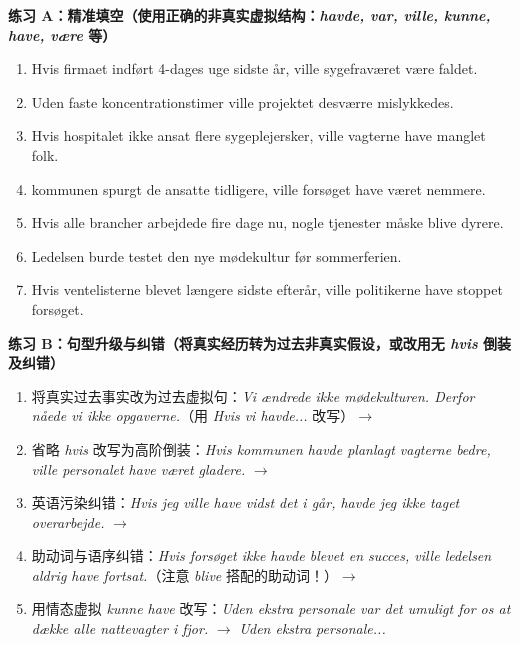 \textbf{练习 A：精准填空（使用正确的非真实虚拟结构：\textit{havde, var, ville, kunne, have, være} 等）}
\begin{enumerate}
  \item Hvis firmaet \underline{\hspace{2.2cm}} indført 4-dages uge sidste år, ville sygefraværet være faldet.
  \item Uden faste koncentrationstimer ville projektet desværre \underline{\hspace{2.2cm}} mislykkedes.
  \item Hvis hospitalet ikke \underline{\hspace{2.2cm}} ansat flere sygeplejersker, ville vagterne have manglet folk.
  \item \underline{\hspace{2.2cm}} kommunen spurgt de ansatte tidligere, ville forsøget have været nemmere.
  \item Hvis alle brancher arbejdede fire dage nu, \underline{\hspace{2.2cm}} nogle tjenester måske blive dyrere.
  \item Ledelsen burde \underline{\hspace{2.2cm}} testet den nye mødekultur før sommerferien.
  \item Hvis ventelisterne \underline{\hspace{1.8cm}} blevet længere sidste efterår, ville politikerne have stoppet forsøget.
\end{enumerate}

\textbf{练习 B：句型升级与纠错（将真实经历转为过去非真实假设，或改用无 \textit{hvis} 倒装及纠错）}
\begin{enumerate}
  \item 将真实过去事实改为过去虚拟句：\textit{Vi ændrede ikke mødekulturen. Derfor nåede vi ikke opgaverne.}（用 \textit{Hvis vi havde...} 改写）$\rightarrow$
  \item 省略 \textit{hvis} 改写为高阶倒装：\textit{Hvis kommunen havde planlagt vagterne bedre, ville personalet have været gladere.} $\rightarrow$
  \item 英语污染纠错：\textit{Hvis jeg ville have vidst det i går, havde jeg ikke taget overarbejde.} $\rightarrow$
  \item 助动词与语序纠错：\textit{Hvis forsøget ikke havde blevet en succes, ville ledelsen aldrig have fortsat.}（注意 \textit{blive} 搭配的助动词！）$\rightarrow$
  \item 用情态虚拟 \textit{kunne have} 改写：\textit{Uden ekstra personale var det umuligt for os at dække alle nattevagter i fjor.} $\rightarrow$ \textit{Uden ekstra personale...}
\end{enumerate}

